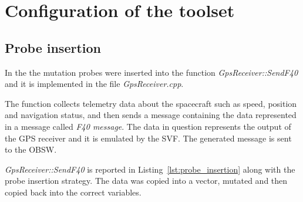 
\chapter{Configuration of the toolset}

\section{Probe insertion}

In the \case the mutation probes were inserted into the function \emph{GpsReceiver::SendF40} and it is implemented in the file \emph{GpsReceiver.cpp}.

The function collects telemetry data about the spacecraft such as speed, position and navigation status, and then sends a message containing the data represented in a message called \emph{F40 message}.
The data in question represents the output of the GPS receiver and it is emulated by the SVF.
The generated message is sent to the OBSW.

\emph{GpsReceiver::SendF40} is reported in Listing~\ref{lst:probe_insertion} along with the probe insertion strategy.
The data was copied into a vector, mutated and then copied back into the correct variables.

